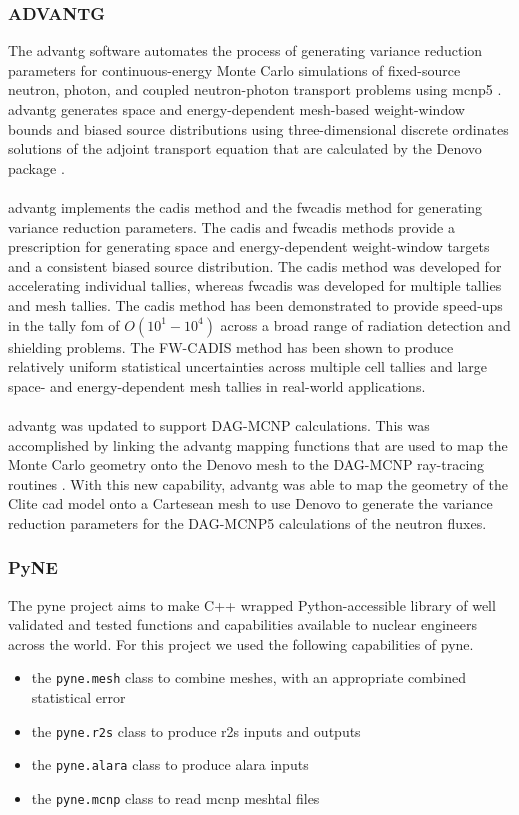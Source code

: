 \documentclass[12pt]{article}
\begin{document}
\subsubsection{ADVANTG}
The \gls{advantg} software automates the 
process of generating variance reduction parameters for continuous-energy Monte 
Carlo simulations of fixed-source neutron, photon, and coupled neutron-photon 
transport problems using \gls{mcnp}5 \cite{advantg}. \gls{advantg} generates 
space and  energy-dependent mesh-based weight-window bounds and biased source 
distributions using three-dimensional discrete ordinates solutions of the 
adjoint transport equation that are calculated by the Denovo package 
\cite{denovo}. 
\\
\\
\gls{advantg} implements the \gls{cadis} method \cite{wagnerNSECADIS} and the 
\gls{fwcadis} method \cite{wagnerNSEFWCADIS} for generating variance reduction 
parameters. The \gls{cadis} and \gls{fwcadis} methods provide a prescription for
generating space and energy-dependent weight-window targets and a consistent 
biased source distribution. The \gls{cadis} method was developed for accelerating
individual tallies, whereas \gls{fwcadis} was developed for multiple tallies and
mesh tallies. The \gls{cadis} method has been demonstrated to provide speed-ups 
in the tally \gls{fom} of $O(10^{1}-10^{4})$ across a broad range of radiation 
detection and shielding problems. The FW-CADIS method has been shown to produce
 relatively uniform statistical uncertainties across multiple cell tallies and 
large space- and energy-dependent mesh tallies in real-world applications.
\\
\\
\gls{advantg} was updated to support DAG-MCNP calculations. This was 
accomplished by linking the \gls{advantg} mapping functions that are used to 
map the Monte Carlo geometry onto the Denovo mesh to the DAG-MCNP 
ray-tracing routines \cite{biondoMC2015}. With this new capability, 
\gls{advantg} was able to map the geometry of the Clite \gls{cad} model onto a 
Cartesean mesh to use Denovo to generate the variance reduction parameters 
for the DAG-MCNP5 calculations of the neutron fluxes.
\subsubsection{PyNE}
The \gls{pyne} \cite{Scopatz2012b} project aims to
make C++ wrapped Python-accessible library of well validated and tested
functions and capabilities available to nuclear engineers across the world.
For this project we used the following capabilities of \gls{pyne}.
\begin{itemize}
  \item{the \texttt{pyne.mesh} class to combine meshes, with an appropriate
        combined statistical error}
  \item{the \texttt{pyne.r2s} class to produce \gls{r2s} inputs and outputs}
  \item{the \texttt{pyne.alara} class to produce alara inputs}
  \item{the \texttt{pyne.mcnp} class to read \gls{mcnp} meshtal files}
\end{itemize}
\end{document}
